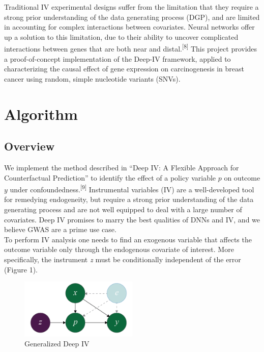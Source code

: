 \documentclass[10.5pt, oneside, twocolumn]{article}   	%
\begin{document}
Traditional IV experimental designs suffer from the limitation that they require a strong prior understanding of the data generating process (DGP), and are limited in accounting for complex interactions between covariates. Neural networks offer up a solution to this limitation, due to their ability to uncover complicated interactions between genes that are both near and distal.\textsuperscript{[8]} This project provides a proof-of-concept implementation of the Deep-IV framework, applied to characterizing the causal effect of gene expression on carcinogenesis in breast cancer using random, simple nucleotide variants (SNVs). 



\section{Algorithm}
\subsection{Overview}
We implement the method described in ``Deep IV: A Flexible Approach for Counterfactual Prediction'' to identify the effect of a policy variable $p$ on outcome $y$ under confoundedness.\textsuperscript{[9]} Instrumental variables (IV) are a well-developed tool for remedying endogeneity, but require a strong prior understanding of the data generating process and are not well equipped to deal with a large number of covariates. Deep IV promises to marry the best qualities of DNNs and IV, and we believe GWAS are a prime use case. \\

To perform IV analysis one needs to find an exogenous variable that affects the outcome variable only through the endogenous covariate of interest. More specifically, the instrument \emph{z} must be conditionally independent of the error (Figure 1).\\

\begin{figure}[h]
	\caption{Generalized Deep IV}
	\centering
	\includegraphics[width=0.5\textwidth]{Figure_1.png}
\end{figure}
\end{document}
